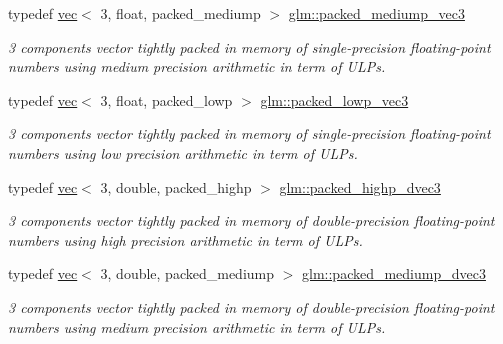 \begin{DoxyCompactItemize}
typedef \hyperlink{structglm_1_1vec}{vec}$<$ 3, float, packed\+\_\+mediump $>$ \hyperlink{group__gtc__type__aligned_ga34ad82503f637918457284618bef3a82}{glm\+::packed\+\_\+mediump\+\_\+vec3}
\begin{DoxyCompactList}\small\item\em 3 components vector tightly packed in memory of single-\/precision floating-\/point numbers using medium precision arithmetic in term of U\+L\+Ps. \end{DoxyCompactList}\item 
\mbox{\label{group__gtc__type__aligned_ga64f20313965454ec7bd89f62ea4946ba}} 
typedef \hyperlink{structglm_1_1vec}{vec}$<$ 3, float, packed\+\_\+lowp $>$ \hyperlink{group__gtc__type__aligned_ga64f20313965454ec7bd89f62ea4946ba}{glm\+::packed\+\_\+lowp\+\_\+vec3}
\begin{DoxyCompactList}\small\item\em 3 components vector tightly packed in memory of single-\/precision floating-\/point numbers using low precision arithmetic in term of U\+L\+Ps. \end{DoxyCompactList}\item 
\mbox{\label{group__gtc__type__aligned_ga46950596525c0d1983113ead5f676651}} 
typedef \hyperlink{structglm_1_1vec}{vec}$<$ 3, double, packed\+\_\+highp $>$ \hyperlink{group__gtc__type__aligned_ga46950596525c0d1983113ead5f676651}{glm\+::packed\+\_\+highp\+\_\+dvec3}
\begin{DoxyCompactList}\small\item\em 3 components vector tightly packed in memory of double-\/precision floating-\/point numbers using high precision arithmetic in term of U\+L\+Ps. \end{DoxyCompactList}\item 
\mbox{\label{group__gtc__type__aligned_ga0c34c771e940f66eccff81d402f83cdd}} 
typedef \hyperlink{structglm_1_1vec}{vec}$<$ 3, double, packed\+\_\+mediump $>$ \hyperlink{group__gtc__type__aligned_ga0c34c771e940f66eccff81d402f83cdd}{glm\+::packed\+\_\+mediump\+\_\+dvec3}
\begin{DoxyCompactList}\small\item\em 3 components vector tightly packed in memory of double-\/precision floating-\/point numbers using medium precision arithmetic in term of U\+L\+Ps. \end{DoxyCompactList}\item 

\end{DoxyCompactItemize}
